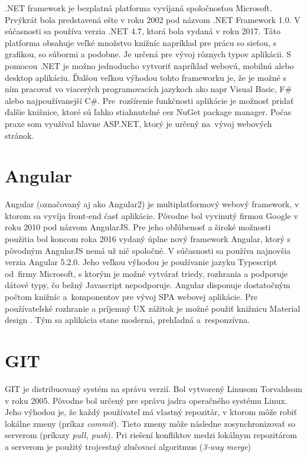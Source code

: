 \documentclass[11pt, oneside]{report}
\begin{document}
.NET framework \cite{net} je bezplatná platforma vyvíjaná spoločnosťou Microsoft. Prvýkrát bola predstavená ešte v roku 2002 pod názvom .NET Framework 1.0. V súčasnosti sa používa verzia .NET 4.7, ktorá bola vydaná v roku 2017. Táto platforma obsahuje veľké množstvo knižníc napríklad pre prácu   so sieťou, s grafikou,  so súbormi a podobne. Je určená pre vývoj rôznych typov aplikácii. S pomocou .NET  je možno jednoducho vytvoriť napríklad webovú, mobilnú alebo desktop aplikáciu. Ďalšou veľkou výhodou tohto frameworku je, že je možné  s ním pracovať vo viacerých programovacích jazykoch ako napr Visual Basic, F\# alebo najpoužívanejší C\#. Pre~rozšírenie funkčnosti aplikácie je možnosť pridať ďalšie knižnice, ktoré sú ľahko stiahnutelné cez NuGet package manager. Počas praxe som využíval hlavne ASP.NET, ktorý je určený na~vývoj webových stránok.

\section{Angular}
Angular\cite{angular} (označovaný aj ako Angular2) je multiplatformový  webový framework, v ktorom sa vyvíja front-end časť aplikácie. Pôvodne bol vyvinutý firmou Google v roku 2010 pod názvom AngularJS. Pre jeho obľúbenosť a široké  možnosti použitia bol koncom roka 2016 vydaný úplne nový framework Angular, ktorý s pôvodným AngularJS nemá už nič spoločné. V súčasnosti sa používa najnovšia verzia Angular 5.2.0.
Jeho veľkou výhodou je používanie jazyku Typescript od~firmy Microsoft,  s ktorým je možné vytvárať triedy, rozhrania a podporuje dátové typy, čo bežný Javascript nepodporuje. Angular disponuje dostatočným počtom knižníc a~komponentov pre vývoj  SPA webovej aplikácie. Pre používateľské rozhranie a príjemný UX zážitok je možné použiť knižnicu Material design \cite{material}. Tým sa aplikácia stane moderná, prehľadná a~responzívna.

\section{GIT}
GIT\cite{git} je distribuovaný systém na správu verzií. Bol vytvorený Linusom Torvaldsom v roku 2005. Pôvodne bol určený pre správu jadra operačného systému Linux. Jeho výhodou je, že každý používateľ má vlastný repozitár, v ktorom môže robiť lokálne zmeny (príkaz \textit{commit}). Tieto zmeny môže následne zosynchronizovať  so serverom (príkazy \textit{ pull, push}). Pri riešení konfliktov medzi lokálnym repozitárom a serverom je použitý trojcestný zlučovací algoritmus (\textit{3-way merge}) 
\end{document}
